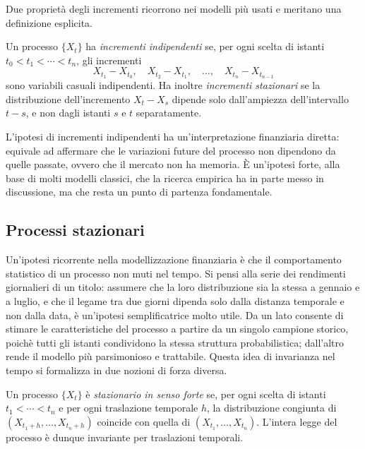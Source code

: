 Due propriet\`{a} degli incrementi ricorrono nei modelli pi\`{u}
usati e meritano una definizione esplicita.

\begin{definition}
\label{def:incrementi}
Un processo $\{X_t\}$ ha \emph{incrementi indipendenti} se, per ogni
scelta di istanti $t_0<t_1<\cdots<t_n$, gli incrementi
\[
X_{t_1}-X_{t_0},\quad X_{t_2}-X_{t_1},\quad\ldots,\quad
X_{t_n}-X_{t_{n-1}}
\]
sono variabili casuali indipendenti. Ha inoltre \emph{incrementi
stazionari} se la distribuzione dell'incremento $X_t-X_s$ dipende solo
dall'ampiezza dell'intervallo $t-s$, e non dagli istanti $s$ e $t$
separatamente.
\end{definition}

L'ipotesi di incrementi indipendenti ha un'interpretazione finanziaria
diretta: equivale ad affermare che le variazioni future del processo
non dipendono da quelle passate, ovvero che il mercato non ha memoria.
\`{E} un'ipotesi forte, alla base di molti modelli classici, che la
ricerca empirica ha in parte messo in discussione, ma che resta un
punto di partenza fondamentale.

\subsection{Processi stazionari}

\noindent
Un'ipotesi ricorrente nella modellizzazione finanziaria \`{e} che il
comportamento statistico di un processo non muti nel tempo. Si pensi
alla serie dei rendimenti giornalieri di un titolo: assumere che la
loro distribuzione sia la stessa a gennaio e a luglio, e che il legame
tra due giorni dipenda solo dalla distanza temporale e non dalla data,
\`{e} un'ipotesi semplificatrice molto utile. Da un lato consente di
stimare le caratteristiche del processo a partire da un singolo
campione storico, poich\`{e} tutti gli istanti condividono la stessa
struttura probabilistica; dall'altro rende il modello pi\`{u} parsimonioso
e trattabile. Questa idea di invarianza nel tempo si formalizza in due
nozioni di forza diversa.

\begin{definition}
\label{def:stazionario-forte}
Un processo $\{X_t\}$ \`{e} \emph{stazionario in senso forte} se, per
ogni scelta di istanti $t_1<\cdots<t_n$ e per ogni traslazione
temporale $h$, la distribuzione congiunta di
$(X_{t_1+h},\ldots,X_{t_n+h})$ coincide con quella di
$(X_{t_1},\ldots,X_{t_n})$. L'intera legge del processo \`{e} dunque
invariante per traslazioni temporali.
\end{definition}

